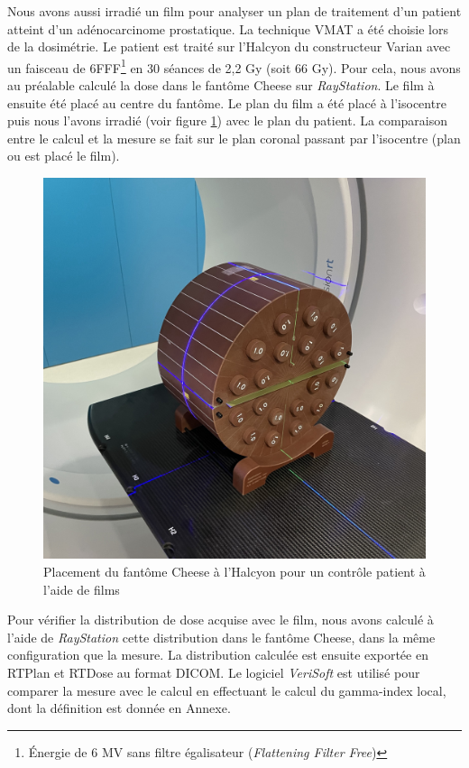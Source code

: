 \documentclass{book}
\begin{document}
Nous avons aussi irradié un film pour analyser un plan de traitement d'un patient atteint d'un adénocarcinome prostatique. La technique VMAT a été choisie lors de la dosimétrie. Le patient est traité sur l'Halcyon du constructeur Varian avec un faisceau de 6FFF\footnote{Énergie de 6 MV sans filtre égalisateur (\textit{Flattening Filter Free})} en 30 séances de 2,2 Gy (soit 66 Gy). Pour cela, nous avons au préalable calculé la dose dans le fantôme Cheese sur \textit{RayStation}. Le film à ensuite été placé au centre du fantôme. Le plan du film a été placé à l'isocentre puis nous l'avons irradié (voir figure \ref*{fig_DQP_films}) avec le plan du patient. La comparaison entre le calcul et la mesure se fait sur le plan coronal passant par l'isocentre (plan ou est placé le film).

\begin{figure}[h]
  \centering
  \includegraphics[scale=0.075]{figures/cheese.jpg}
  \caption{Placement du fantôme Cheese à l'Halcyon pour un contrôle patient à l'aide de films}
  \label{fig_DQP_films}
\end{figure}

Pour vérifier la distribution de dose acquise avec le film, nous avons calculé à l'aide de \textit{RayStation} cette distribution dans le fantôme Cheese, dans la même configuration que la mesure. La distribution calculée est ensuite exportée en RTPlan et RTDose au format DICOM. Le logiciel \textit{VeriSoft} est utilisé pour comparer la mesure avec le calcul en effectuant le calcul du gamma-index local, dont la définition est donnée en Annexe.
\end{document}
